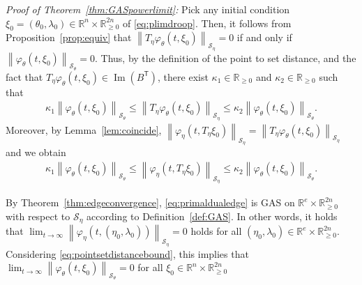 \documentclass[twocolumn,twoside,journal]{IEEEtran}
\DeclareMathOperator{\Ima}{Im}
\newcommand{\mc}{\mathcal}
\newcommand{\norm}[1]{\left \lVert #1 \right \rVert}
\begin{document}
\textit{Proof of Theorem~\ref{thm:GASpowerlimit}:}
Pick any initial condition $\xi_0=(\theta_0,\lambda_0) \in \mathbb{R}^{n} \times \mathbb{R}^{2n}_{\geq0}$ of \eqref{eq:plimdroop}. Then, it follows from Proposition~\ref{prop:equiv} that $\norm{T_\eta \varphi_\theta(t,\xi_0)}_{\mc S_\eta}=0$ if and only if $\norm{\varphi_\theta(t,\xi_0)}_{\mc S_\theta}=0$. Thus, by the definition of the point to set distance, and the fact that $T_\eta \varphi_\theta(t,\xi_0) \in \Ima(B^\mathsf{T})$, there exist $\kappa_1 \in \mathbb{R}_{\geq 0}$ and $\kappa_2 \in \mathbb{R}_{\geq 0}$ such that 
\begin{align*}
    \kappa_1 \norm{\varphi_\theta(t,\xi_0)}_{\mc S_\theta} \leq \norm{T_\eta \varphi_\theta(t,\xi_0)}_{\mc S_\eta}  \leq \kappa_2 \norm{\varphi_\theta(t,\xi_0)}_{\mc S_\theta}.
\end{align*}
Moreover, by Lemma~\ref{lem:coincide}, $\norm{\varphi_\eta(t,T_\eta \xi_0)}_{\mc S_\eta}=\norm{T_\eta \varphi_\theta(t,\xi_0)}_{\mc S_\eta}$ and we obtain
\begin{align}\label{eq:pointsetdistancebound}
    \!\!\kappa_1\norm{\varphi_\theta(t,\xi_0)}_{\mc S_\theta}\! \leq \norm{\varphi_\eta(t,T_\eta \xi_0)}_{\mc S_\eta}\! \leq \kappa_2 \norm{\varphi_\theta(t,\xi_0)}_{\mc S_\theta}\!. 
\end{align}

By Theorem~\ref{thm:edgeconvergence}, \eqref{eq:primaldualedge} is GAS on $\mathbb{R}^{e} \times \mathbb{R}^{2n}_{\geq0}$ with respect to $\mc S_\eta$ according to Definition~\ref{def:GAS}. In other words, it holds that $\lim_{t\to\infty} \norm{\varphi_\eta(t,(\eta_0,\lambda_0))}_{\mc S_\eta} = 0$ holds for all $(\eta_0,\lambda_0) \in \mathbb{R}^{e} \times \mathbb{R}^{2n}_{\geq0}$. Considering \eqref{eq:pointsetdistancebound}, this implies that $\lim_{t\to\infty} \norm{\varphi_\theta(t,\xi_0)}_{\mc S_\theta} = 0$ for all $\xi_0 \in \mathbb{R}^{n} \times \mathbb{R}^{2n}_{\geq0}$
\end{document}
